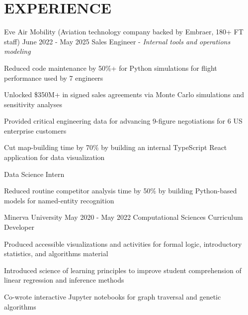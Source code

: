 \section{EXPERIENCE}

\begin{experience}[Melbourne, FL]
                   {Eve Air Mobility \textnormal{(Aviation technology company backed by Embraer, 180+ FT staff)}}
                   {June 2022 - May 2025}
                   {Sales Engineer - \textnormal{\textit{Internal tools and operations modeling}}}
    \item Reduced code maintenance by 50\%+ for Python simulations for flight performance used by 7 engineers
    \item Unlocked \$350M+ in signed sales agreements via Monte Carlo simulations and sensitivity analyses
    \item Provided critical engineering data for advancing 9-figure negotiations for 6 US enterprise customers
    \item Cut map-building time by 70\% by building an internal TypeScript React application for data visualization 
\end{experience}

\vspace{0.1 cm}

\begin{same_org_experience}
                   {Data Science Intern}
    \item Reduced routine competitor analysis time by 50\% by building Python-based models for named-entity recognition 
\end{same_org_experience}

\begin{exclude}{
    \begin{experience}
                   {Minerva University}
                   {May 2020 - May 2022}
                   {Computational Sciences Curriculum Developer}
    \item Produced accessible visualizations and activities for formal logic, introductory statistics, and algorithms material
    \item Introduced science of learning principles to improve student comprehension of linear regression and inference methods
    \item Co-wrote interactive Jupyter notebooks for graph traversal and genetic algorithms
\end{experience}
}
\end{exclude}

